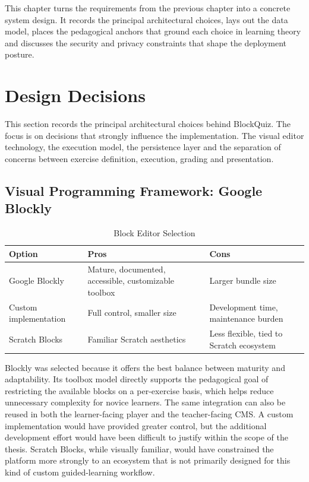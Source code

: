 This chapter turns the requirements from the previous chapter into a concrete system design.
It records the principal architectural choices, lays out the data model, places the pedagogical anchors
that ground each choice in learning theory and discusses the security and privacy constraints that shape the
deployment posture.

\section{Design Decisions}
This section records the principal architectural choices behind BlockQuiz. The focus is on decisions that strongly
influence the implementation. The visual editor technology, the execution model, the persistence layer and the separation of
concerns between exercise definition, execution, grading and presentation.

\subsection{Visual Programming Framework: Google Blockly}
\begin{table}[h]
  \centering
  \label{tab:block-editor-selection}
  \caption{Block Editor Selection}
  \begin{tabularx}{0.9\textwidth}{|l|X|X|}
    \hline
    \textbf{Option}                & \textbf{Pros}                                                 & \textbf{Cons}                                     \\\hline
    Google Blockly        & Mature, documented, accessible, customizable toolbox & Larger bundle size                       \\\hline
    Custom implementation & Full control, smaller size                           & Development time, maintenance burden     \\\hline
    Scratch Blocks        & Familiar Scratch aesthetics                          & Less flexible, tied to Scratch ecosystem \\\hline
  \end{tabularx}
\end{table}

Blockly was selected because it offers the best balance between maturity and adaptability.
Its toolbox model directly supports the pedagogical goal of restricting the available blocks on a per-exercise basis, which helps reduce unnecessary complexity
for novice learners. The same integration can also be reused in both the learner-facing player and the teacher-facing CMS.
A custom implementation would have provided greater control, but the additional development effort would have been difficult to justify within the scope of the thesis.
Scratch Blocks, while visually familiar, would have constrained the platform more strongly to an ecosystem that is not primarily designed for this kind of custom guided-learning workflow.

